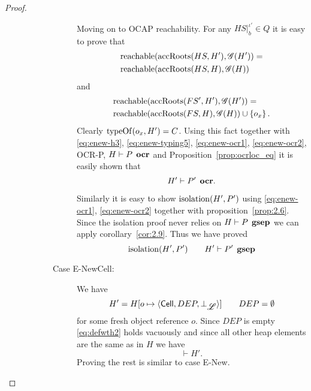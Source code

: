 \begin{proof}
\begin{description}
\begin{description}
\begin{description}
              Moving on to OCAP reachability. For any $HS|_b^{\iota'} \in Q$ it
              is easy to prove that
              \begin{equation} \label{eq:enew-ocr1}
                \begin{aligned}
                  &\mbox{$\mathrm{reachable}$}(\mbox{$\mathrm{accRoots}$}(HS, H'), \mathscr{G}(H')) = \\
                  &\mbox{$\mathrm{reachable}$}(\mbox{$\mathrm{accRoots}$}(HS, H), \mathscr{G}(H)) 
                \end{aligned}
              \end{equation}
              and
              \begin{equation} \label{eq:enew-ocr2}
                \begin{aligned}
                  &\mbox{$\mathrm{reachable}$}(\mbox{$\mathrm{accRoots}$}(FS', H'), \mathscr{G}(H')) = \\
                  &\mbox{$\mathrm{reachable}$}(\mbox{$\mathrm{accRoots}$}(FS, H), \mathscr{G}(H)) \cup \left\{ o_x
                  \right\}.
                \end{aligned}
              \end{equation}
              Clearly $\mbox{$\mathrm{typeOf}$}(o_x, H') = C$. Using this fact together with
              \eqref{eq:enew-h3}, \eqref{eq:enew-typing5}, \eqref{eq:enew-ocr1},
              \eqref{eq:enew-ocr2}, {\sc OCR-P}, $H \vdash P \:\: \mbox{\bf ocr}$ and
              Proposition~\ref{prop:ocrloc_eq} it is easily shown that
              \begin{equation}
                H' \vdash P' \:\: \mbox{\bf ocr}.
              \end{equation}

              Similarly it is easy to show $\mbox{$\mathrm{isolation}$}(H', P')$ using
              \eqref{eq:enew-ocr1}, \eqref{eq:enew-ocr2} together with
              proposition~\ref{prop:2.6}. Since the isolation proof never relies
              on $H \vdash P \:\: \mbox{\bf gsep}$ we can apply
              corollary~\ref{cor:2.9}. Thus we have proved
              \begin{equation}
                \mbox{$\mathrm{isolation}$}(H', P') \quad\quad H' \vdash P' \:\: \mbox{\bf gsep}
              \end{equation}

            \item[Case {\sc E-NewCell}:] We have
              \begin{equation}
                H' = H[o \mapsto \mbox{$\langle \mbox{$\mathsf{Cell}$}{}, DEP, \bot_{\mbox{$\mathscr{L}$}} \rangle$}] \quad\quad DEP = \emptyset
              \end{equation}
              for some fresh object reference $o$. 
              Since $DEP$ is empty \eqref{eq:defwth2} holds vacuously and since
              all other heap elements are the same as in $H$ we have
              \begin{equation}
                \vdash H'.
              \end{equation}
              Proving the rest is similar to case {\sc E-New}.


\end{description}
\end{description}
\end{description}
\end{proof}
